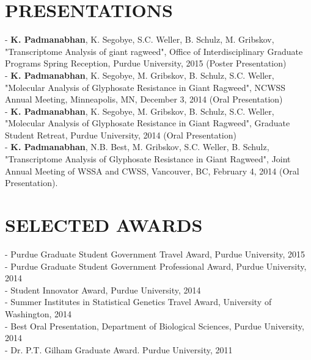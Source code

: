 \documentclass[11pt,letterpaper,sans]{moderncv}        %
\begin{document}
{\section{PRESENTATIONS}
\begin{minipage}{\maincolumnwidth}%
	\small{
	- \textbf{K. Padmanabhan}, K. Segobye, S.C. Weller, B. Schulz, M. Gribskov, "Transcriptome Analysis of giant ragweed", Office of Interdisciplinary Graduate Programs Spring Reception, Purdue University, 2015 (Poster Presentation)\\
	- \textbf{K. Padmanabhan}, K. Segobye, M. Gribskov, B. Schulz, S.C. Weller, "Molecular Analysis of Glyphosate Resistance in Giant Ragweed", NCWSS Annual Meeting, Minneapolis, MN, December 3, 2014 (Oral Presentation)\\
	- \textbf{K. Padmanabhan}, K. Segobye, M. Gribskov, B. Schulz, S.C. Weller, "Molecular Analysis of Glyphosate Resistance in Giant Ragweed", Graduate Student Retreat, Purdue University, 2014 (Oral Presentation)\\
          - \textbf{K. Padmanabhan}, N.B. Best, M. Gribskov, S.C. Weller, B. Schulz, "Transcriptome Analysis of Glyphosate Resistance in Giant Ragweed", Joint Annual Meeting of WSSA and CWSS, Vancouver, BC, February 4, 2014 (Oral Presentation).  
	}%
\end{minipage}%

\section{SELECTED AWARDS}
\begin{minipage}{\maincolumnwidth}%
	\small{
	- Purdue Graduate Student Government Travel Award, Purdue University, 2015\\
          - Purdue Graduate Student Government Professional Award, Purdue University, 2014\\
          - Student Innovator Award, Purdue University, 2014\\
          - Summer Institutes in Statistical Genetics Travel Award, University of Washington, 2014\\
	- Best Oral Presentation, Department of Biological Sciences, Purdue University, 2014\\
	 - Dr. P.T. Gilham Graduate Award. Purdue University, 2011
	}%
\end{minipage}%
 
}
\end{document}
